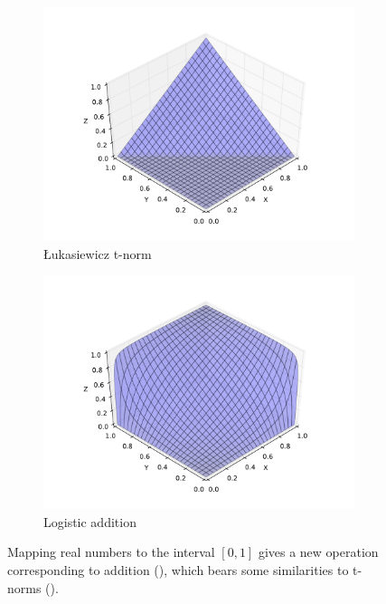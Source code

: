 \documentclass[preprint,leqno]{elsarticle}
\begin{document}
\begin{figure}
  \begin{subfigure}{0.49\textwidth}
    \includegraphics[width=\textwidth]{lukasiewicz.pdf}
    \caption{\L ukasiewicz t-norm}
    \label{fig:lukasiewicz}
  \end{subfigure}
  \begin{subfigure}{0.49\textwidth}
    \includegraphics[width=\textwidth]{rieszfunc.pdf}
    \caption{Logistic addition}
    \label{fig:logistic}
  \end{subfigure}
  \caption{Mapping real numbers to the interval $[0,1]$ gives a new
    operation corresponding to addition (), which
    bears some similarities to t-norms ().}
  \label{fig:tnorm}
\end{figure}
\end{document}
